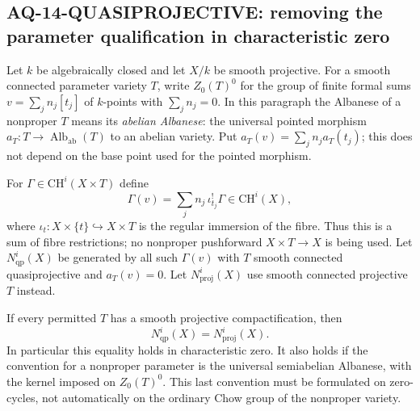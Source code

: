 \subsection{AQ-14-QUASIPROJECTIVE: removing the parameter qualification in characteristic zero}
Let $k$ be algebraically closed and let $X/k$ be smooth projective.
For a smooth connected parameter variety $T$, write
$Z_0(T)^0$ for the group of finite formal sums
$v=\sum_jn_j[t_j]$ of $k$-points with $\sum_jn_j=0$.
In this paragraph the Albanese of a nonproper $T$ means its
\emph{abelian Albanese}: the universal pointed morphism
$a_T:T\to\operatorname{Alb}_{\mathrm{ab}}(T)$ to an abelian
variety. Put $a_T(v)=\sum_jn_ja_T(t_j)$; this does not depend
on the base point used for the pointed morphism.

For $\Gamma\in\mathrm{CH}^i(X\times T)$ define
\[
 \Gamma(v)=\sum_j n_j\,\iota_{t_j}^{!}\Gamma
                         \in\mathrm{CH}^i(X),
\]
where $\iota_t:X\times\{t\}\hookrightarrow X\times T$
is the regular immersion of the fibre. Thus this is a
sum of fibre restrictions; no nonproper pushforward
$X\times T\to X$ is being used. Let $N^i_{\mathrm{qp}}(X)$
be generated by all such $\Gamma(v)$ with $T$ smooth connected
quasiprojective and $a_T(v)=0$. Let $N^i_{\mathrm{proj}}(X)$
use smooth connected projective $T$ instead.

If every permitted $T$ has a smooth projective compactification,
then
\[
 N^i_{\mathrm{qp}}(X)=N^i_{\mathrm{proj}}(X).                 \tag{AQ.14.1}
\]
In particular this equality holds in characteristic zero.
It also holds if the convention for a nonproper parameter is
the universal semiabelian Albanese, with the kernel imposed
on $Z_0(T)^0$. This last convention must be formulated on
zero-cycles, not automatically on the ordinary Chow group
of the nonproper variety.

